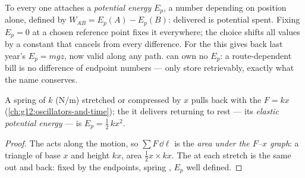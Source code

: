\begin{definition}\label{def:g12:work-and-energy:ep}
To every  one attaches a
\emph{potential energy}
$E_p$, a number depending on position alone, defined by
$W_{AB} = E_p(A) - E_p(B)$:  delivered is potential  spent.
Fixing $E_p = 0$ at a chosen reference point fixes it everywhere; the
choice shifts all values by a constant that cancels from every
difference. For the  this gives back last year's $E_p = mgz$,
now valid along any path.  can own no $E_p$: a route-dependent
bill is no difference of endpoint numbers --- only 
store retrievably, exactly what the name conserves.
\end{definition}

\begin{proposition}\label{prop:g12:work-and-energy:elastic}
A spring of  $k$ (\unit{N/m}) stretched or compressed by $x$
pulls back with the  $F = kx$
(\cref{ch:g12:oscillators-and-time}); the  it delivers returning
to rest --- its
\emph{elastic potential energy} --- is
$E_p = \tfrac12\, k x^2$.
\end{proposition}

\begin{proof}
The  acts along the motion, so $\sum F\,\dd\ell$ is
the \emph{area under the $F$--$x$ graph}: a triangle of base $x$ and
height $kx$, area $\tfrac12 x \times kx$. The  at each stretch
is the same out and back:  fixed by the endpoints, spring 
, $E_p$ well defined.
\end{proof}

